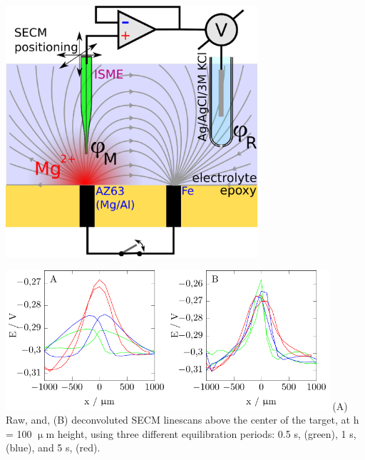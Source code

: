 \documentclass{beamer}
\begin{document}
\begin{frame}
\begin{center}
\includegraphics[width=0.7\textwidth]{field.eps}
\end{center}
\end{frame}

\begin{frame}
\centering
\includegraphics[width=0.45\textwidth]{phd-figure20.pdf}\hfill \includegraphics[width=0.45\textwidth]{phd-figure21.pdf}
\vfill
(A) Raw, and, (B) deconvoluted SECM linescans above the center of the target, at h = 100 $\upmu$m height, using three different equilibration periods: 0.5 s, (green), 1 s, (blue), and 5 s, (red).
\end{frame}
\end{document}
